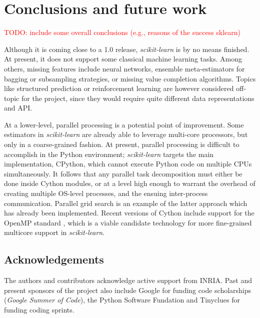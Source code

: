 \documentclass{llncs}
\newcommand{\sklearn}{\textit{scikit-learn}\xspace}
\DeclareRobustCommand{\VAN}[3]{#2}
\begin{document}
\section{Conclusions and future work}
\label{sec:conclusions}

\textcolor{red}{TODO: include some overall conclusions (e.g., reasons of the success sklearn)}

Although it is coming close to a 1.0 release, \sklearn is by no means finished.
At present, it does not support some classical machine learning tasks. Among
others, missing features include neural networks, ensemble meta-estimators for
bagging or subsampling strategies, or missing value completion algorithms.
Topics like structured prediction or reinforcement learning are however
considered off-topic for the project, since they would require quite different
data representations and API.

At a lower-level, parallel processing is a potential point of improvement.
Some estimators in \sklearn are already able to leverage multi-core processors,
but only in a coarse-grained fashion.
At present, parallel processing is difficult to accomplish in the Python environment;
\sklearn targets the main implementation, CPython,
which cannot execute Python code on multiple CPUs simultaneously.
It follows that any parallel task decomposition must either be done
inside Cython modules,
or at a level high enough to warrant the overhead
of creating multiple OS-level processes,
and the ensuing inter-process communication.
Parallel grid search is an example of the latter approach
which has already been implemented.
Recent versions of Cython include support for the OpenMP standard
\citep{dagum1998openmp},
which is a viable candidate technology
for more fine-grained multicore support in \sklearn.

\subsection*{Acknowledgements}

The authors and contributors acknowledge active support from INRIA. Past and
present sponsors of the project also include Google for funding code
scholarships (\textit{Google Summer of Code}),
the Python Software Fundation and Tinyclues for funding coding sprints.


\DeclareRobustCommand{\VAN}[3]{#3}

\end{document}
